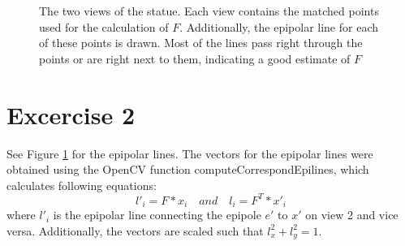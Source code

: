 \documentclass[11pt,a4paper]{article}
\begin{document}
\begin{figure}

\caption{The two views of the statue. Each view contains the matched points used for the calculation of $F$. Additionally, the epipolar line for each of these points is drawn. Most of the lines pass right through the points or are right next to them, indicating a good estimate of $F$}%
\label{fig:2}
\end{figure}


\section{Excercise 2}
See Figure \ref{fig:2} for the epipolar lines. The vectors for the epipolar lines were obtained using the OpenCV function computeCorrespondEpilines, which calculates following equations:
\begin{equation}
l'_{i}=F*x_{i} \quad and \quad l_{i}=F^{T}*x'_{i}
\end{equation}
where $l'_{i}$ is the epipolar line connecting the epipole $e'$ to $x'$ on view 2 and vice versa. Additionally, the vectors are scaled such that $l_{x}^{2}+l_{y}^{2} = 1$.
\end{document}
